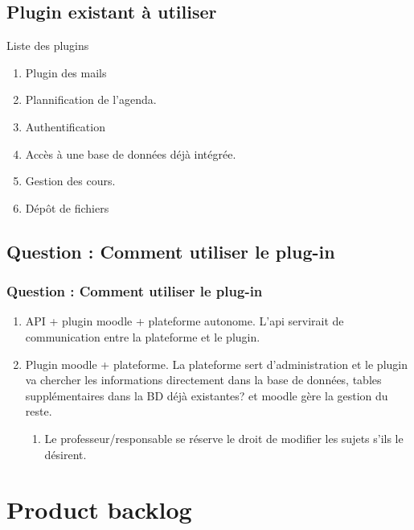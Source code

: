 \documentclass[numbering=fraction]{beamer}
\begin{document}
\subsection{Plugin existant à utiliser}
\begin{frame}{Liste des plugins}
    \begin{enumerate}
     \item Plugin des mails
     \item Plannification de l'agenda.
     \item Authentification
     \item Accès à une base de données déjà intégrée.
     \item Gestion des cours.
     \item Dépôt de fichiers
    \end{enumerate}
\end{frame}
\subsection{Question : Comment utiliser le plug-in}
\begin{frame}
    \frametitle{Question : Comment utiliser le plug-in}
    \begin{enumerate}
        \item API + plugin moodle + plateforme autonome. L'api servirait de communication entre la plateforme et le plugin.
        \item Plugin moodle + plateforme. La plateforme sert d'administration et le plugin va chercher les informations directement dans la base de données, tables supplémentaires dans la BD déjà existantes? et moodle gère la gestion du reste.
        \begin{enumerate}
            \item Le professeur/responsable se réserve le droit de modifier les sujets s'ils le désirent.
        \end{enumerate}
    \end{enumerate}
\end{frame}

\section{Product backlog}
\end{document}
